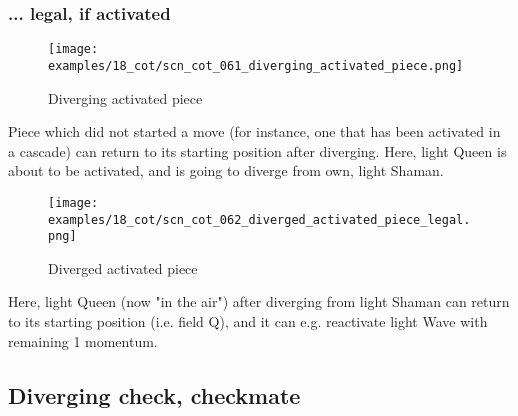 \subsubsection*{... legal, if activated}
\label{sec:Conquest of Tlalocan/Divergence/Diverging to starting position/... legal, if activated}

\vspace*{-0.9\baselineskip}
\noindent
\begin{wrapfigure}[7]{l}{0.4\textwidth}
\centering
\texttt{[image: examples/18\_cot/scn\_cot\_061\_diverging\_activated\_piece.png]}
\vspace*{-0.4\baselineskip}
\caption{Diverging activated piece}
\label{fig:scn_cot_061_diverging_activated_piece}
\end{wrapfigure}
Piece which did not started a move (for instance, one that has been activated
in a cascade) can return to its starting position after diverging.\newline
\indent
Here, light Queen is about to be activated, and is going to diverge from own,
light Shaman.

\vspace*{2.9\baselineskip}
\noindent
\begin{wrapfigure}[6]{l}{0.4\textwidth}
\centering
\texttt{[image: examples/18\_cot/scn\_cot\_062\_diverged\_activated\_piece\_legal.png]}
\vspace*{-0.4\baselineskip}
\caption{Diverged activated piece}
\label{fig:scn_cot_062_diverged_activated_piece_legal}
\end{wrapfigure}
Here, light Queen (now "in the air") after diverging from light Shaman can return
to its starting position (i.e. field Q), and it can e.g. reactivate light Wave with
remaining 1 momentum.

\clearpage %

\subsection*{Diverging check, checkmate}
\label{sec:Conquest of Tlalocan/Divergence/Diverging check, checkmate}

